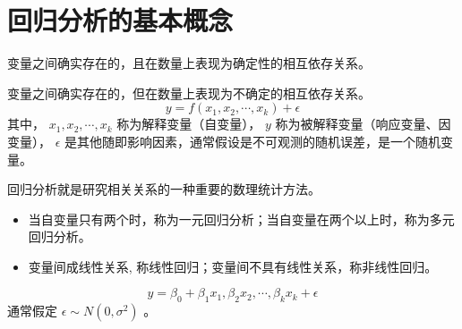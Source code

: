 \section{回归分析的基本概念}


 变量之间确实存在的，且在数量上表现为确定性的相互依存关系。

 变量之间确实存在的，但在数量上表现为不确定的相互依存关系。
\begin{equation}
    y = f(x_1, x_2, \cdots, x_k) + \epsilon
\end{equation}
其中， $ x_1, x_2, \cdots, x_k $ 称为解释变量（自变量）， $ y $ 称为被解释变量（响应变量、因变量），
$ \epsilon $ 是其他随即影响因素，通常假设是不可观测的随机误差，是一个随机变量。

 回归分析就是研究相关关系的一种重要的数理统计方法。


\begin{itemize}[leftmargin=\subparitemindent]
    \item 当自变量只有两个时，称为一元回归分析；当自变量在两个以上时，称为多元回归分析。
    \item 变量间成线性关系, 称线性回归；变量间不具有线性关系，称非线性回归。
\end{itemize}

 \begin{equation}
    y = \beta_0 + \beta_1 x_1, \beta_2 x_2, \cdots, \beta_k x_k + \epsilon
\end{equation}
通常假定 $ \epsilon \sim N(0, \sigma^2) $ 。

